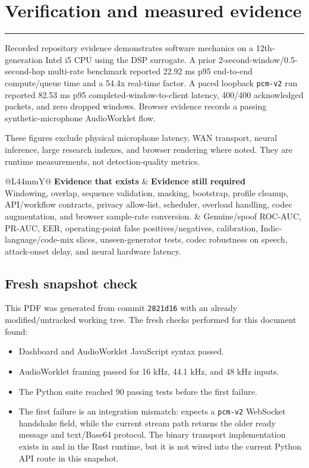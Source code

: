 \documentclass[10pt,a4paper]{article}
\newcommand{\sectionrule}{\vspace{-2mm}\textcolor{blue}{\rule{22mm}{1.2pt}}\vspace{2mm}}
\newcommand{\code}[1]{\texttt{\small #1}}
\begin{document}
\section{Verification and measured evidence}
\sectionrule

Recorded repository evidence demonstrates software mechanics on a 12th-generation Intel i5 CPU using the DSP surrogate. A prior 2-second-window/0.5-second-hop multi-rate benchmark reported 22.92 ms p95 end-to-end compute/queue time and a 54.4x real-time factor. A paced loopback \code{pcm-v2} run reported 82.53 ms p95 completed-window-to-client latency, 400/400 acknowledged packets, and zero dropped windows. Browser evidence records a passing synthetic-microphone AudioWorklet flow.

These figures exclude physical microphone latency, WAN transport, neural inference, large research indexes, and browser rendering where noted. They are runtime measurements, not detection-quality metrics.

\begin{tabularx}{\linewidth}{@{}L{44mm}Y@{}}
\toprule
\textbf{Evidence that exists} & \textbf{Evidence still required}\\
\midrule
Windowing, overlap, sequence validation, masking, bootstrap, profile cleanup, API/workflow contracts, privacy allow-list, scheduler, overload handling, codec augmentation, and browser sample-rate conversion. & Genuine/spoof ROC-AUC, PR-AUC, EER, operating-point false positives/negatives, calibration, Indic-language/code-mix slices, unseen-generator tests, codec robustness on speech, attack-onset delay, and neural hardware latency.\\
\bottomrule
\end{tabularx}

\subsection{Fresh snapshot check}\label{sec:status}

This PDF was generated from commit \code{2821d16} with an already modified/untracked working tree. The fresh checks performed for this document found:

\begin{itemize}
\item Dashboard and AudioWorklet JavaScript syntax passed.
\item AudioWorklet framing passed for 16 kHz, 44.1 kHz, and 48 kHz inputs.
\item The Python suite reached 90 passing tests before the first failure.
\item The first failure is an integration mismatch:  expects a \code{pcm-v2} WebSocket handshake field, while the current  stream path returns the older ready message and text/Base64 protocol. The binary transport implementation exists in  and in the Rust runtime, but it is not wired into the current Python API route in this snapshot.
\end{itemize}
\end{document}
